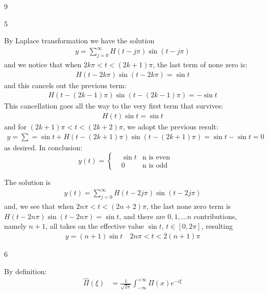 \begin{vv286}{9}
  \begin{vv286_ms}{5}
  \item[(i)]
    By Laplace transformation we have the solution
    \begin{align*}
      y=\sum_{j=0}^{\infty}H(t-j\pi)\sin (t-j\pi)
    \end{align*}
    and we notice that when $2k\pi<t<(2k+1)\pi$, the last term
    of none zero is:
    \begin{align*}
      H(t-2k\pi)\sin (t-2k\pi)=\sin  t
    \end{align*}
    and this cancels out the previous term:
    \begin{align*}
      H(t-(2k-1)\pi)\sin (t-(2k-1)\pi)=-\sin t
    \end{align*}
    This cancellation goes all the way to the very first term
    that survives:
    \begin{align*}
      H(t)\sin t=\sin t
    \end{align*}
    and for $(2k+1)\pi<t<(2k+2)\pi$, we adopt the previous
    result:
    \begin{align*}
      y=\sum=\sin t+H(t-(2k+1)\pi)\sin (t-(2k+1)\pi)=\sin t-\sin t=0
    \end{align*}
    as desired.
    In conclusion:
\begin{equation*}
 y(t)= \left\{\begin{aligned}
    &\sin t &\text{n is even}\\
    &0 &\text{n is odd}
       \end{aligned}
 \right.
 \qquad
 \end{equation*}
\item[(ii)]
  The solution is
  \begin{align*}
    y(t)=\sum_{j=0}^{\infty}H(t-2j\pi)\sin (t-2j\pi)
  \end{align*}
  and, we see that when $2n\pi<t<(2n+2)\pi$, the last none zero
  term is $H(t-2n\pi)\sin (t-2n\pi)=\sin t$, and there are
  $0,1, \ldots n$ contributions, namely $n+1$, all takes on the
  effective value $\sin t$, $t\in[0, 2\pi]$, resulting
  \begin{align*}
    y=(n+1)\sin t \quad 2n\pi<t<2(n+1)\pi
  \end{align*}
  \end{vv286_ms}
  \begin{vv286_mp}{6}
  \item[(i)]
    By definition:
    \begin{align*}
      \widehat{\Pi}(\xi)&=\frac{1}{\sqrt{2\pi}}\int_{-\infty}^{+\infty}\Pi(x)e^{-i\xi
}
\end{align*}
\end{vv286_mp}
\end{vv286}
